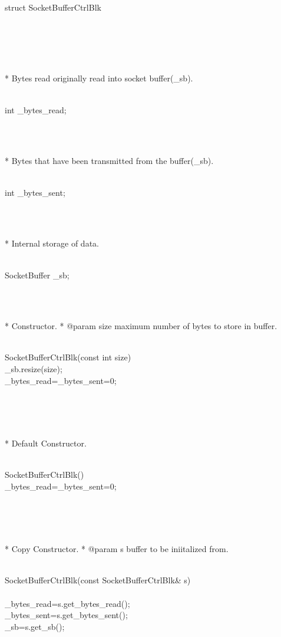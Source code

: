 \documentclass{article}
\begin{document}
 struct SocketBufferCtrlBlk {
\strut\\\strut\\* Bytes read originally read into socket buffer(_sb). \strut\goodbreak
{}\strut\nopagebreak\\
     int _bytes_read;
\strut\\\strut\\* Bytes that have been transmitted from the buffer(_sb). \strut\goodbreak
{}\strut\nopagebreak\\
     int _bytes_sent;
\strut\\\strut\\* Internal storage of data. \strut\goodbreak
{}\strut\nopagebreak\\
     SocketBuffer _sb;
\strut\\\strut\\* Constructor.
	  * @param size maximum number of bytes to store in buffer.
	  \strut\goodbreak
{}\strut\nopagebreak\\
     SocketBufferCtrlBlk(const int size) {
\\
         _sb.resize(size);
\\
         _bytes_read=_bytes_sent=0;
\\
     }
\strut\\\strut\\* Default Constructor.  \strut\goodbreak
{}\strut\nopagebreak\\
     SocketBufferCtrlBlk() {
\\
         _bytes_read=_bytes_sent=0;
\\
     }
\strut\\\strut\\* Copy Constructor.  
	  * @param s buffer to be iniitalized from. 
	  \strut\goodbreak
{}\strut\nopagebreak\\
     SocketBufferCtrlBlk(const SocketBufferCtrlBlk& s)
\\
     {
\\
         _bytes_read=s.get_bytes_read();
\\
         _bytes_sent=s.get_bytes_sent();
\\
         _sb=s.get_sb();
}}
\end{document}
